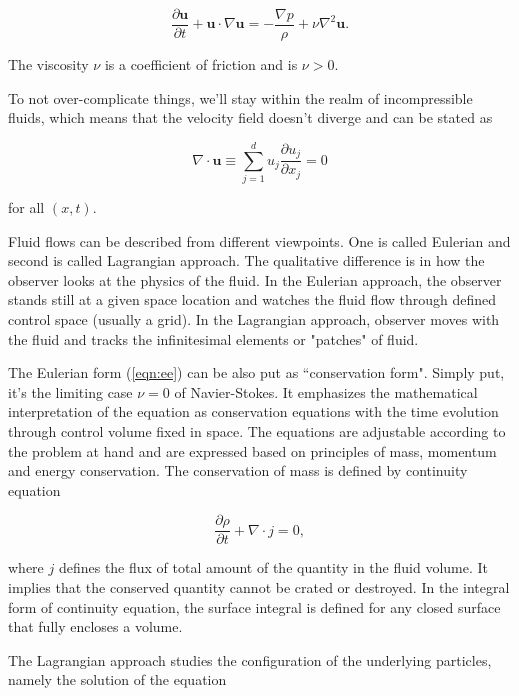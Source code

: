 \begin{equation} 
	\label{eqn:ns-modern}
	\frac{\partial \bm{u}}{\partial t} + \bm{u} \cdot \nabla \bm{u} = - \frac{\nabla p}{\rho} + \nu \nabla^2 \bm{u}.
\end{equation}

The viscosity $\nu$ is a coefficient of friction and is $\nu  > 0$.

To not over-complicate things, we'll stay within the realm of incompressible fluids, which means that the velocity field doesn't diverge and can be stated as

\begin{equation} 
	\label{eqn:div-u}
	\nabla \cdot \bm{u} \equiv \sum_{j=1}^{d} u_j \frac{\partial u_j}{\partial x_j}= 0
\end{equation}

for all $(x, t)$.

Fluid flows can be described from different viewpoints. One is called Eulerian and second is called Lagrangian approach. The qualitative difference is in how the observer looks at the physics of the fluid. In the Eulerian approach, the observer stands still at a given space location and watches the fluid flow through defined control space (usually a grid). In the Lagrangian approach, observer moves with the fluid and tracks the infinitesimal elements or "patches" of fluid.

The Eulerian form (\ref{eqn:ee}) can be also put as ``conservation form". Simply put, it's the limiting case $\nu = 0$ of Navier-Stokes. It emphasizes the mathematical interpretation of the equation as conservation equations with the time evolution through control volume fixed in space. The equations are adjustable according to the problem at hand and are expressed based on principles of mass, momentum and energy conservation. The conservation of mass is defined by continuity equation

\begin{equation}
\frac{\partial \rho}{\partial t} + \nabla \cdot j = 0,
\end{equation}

where $j$ defines the flux of total amount of the quantity in the fluid volume. It implies that the conserved quantity cannot be crated or destroyed. In the integral form of continuity equation, the surface integral is defined for any closed surface that fully encloses a volume. 

The Lagrangian approach studies the configuration of the underlying particles, namely the solution of the equation

